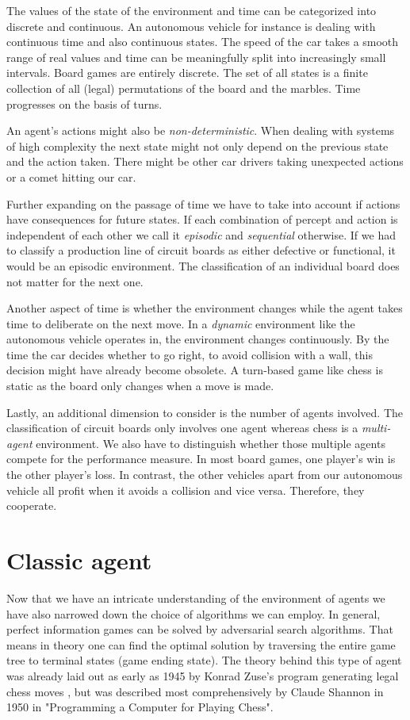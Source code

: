 The values of the state of the environment and time can be categorized into discrete and continuous. An autonomous vehicle for instance is dealing with continuous time and also continuous states. The speed of the car takes a smooth range of real values and time can be meaningfully split into increasingly small intervals. Board games are entirely discrete. The set of all states is a finite collection of all (legal) permutations of the board and the marbles. Time progresses on the basis of turns.

An agent's actions might also be \textit{non-deterministic}. When dealing with systems of high complexity the next state might not only depend on the previous state and the action taken. There might be other car drivers taking unexpected actions or a comet hitting our car.

Further expanding on the passage of time we have to take into account if actions have consequences for future states. If each combination of percept and action is independent of each other we call it \textit{episodic} and \textit{sequential} otherwise. If we had to classify a production line of circuit boards as either defective or functional, it would be an episodic environment. The classification of an individual board does not matter for the next one.

Another aspect of time is whether the environment changes while the agent takes time to deliberate on the next move. In a \textit{dynamic} environment like the autonomous vehicle operates in, the environment changes continuously. By the time the car decides whether to go right, to avoid collision with a wall, this decision might have already become obsolete. A  turn-based game like chess is static as the board only changes when a move is made.

Lastly, an additional dimension to consider is the number of agents involved. The classification of circuit boards only involves one agent whereas chess is a \textit{multi-agent} environment. We also have to distinguish whether those multiple agents compete for the performance measure. In most board games, one player's win is the other player's loss. In contrast, the other vehicles apart from our autonomous vehicle all profit when it avoids a collision and vice versa. Therefore, they cooperate.



\section{Classic agent}
Now that we have an intricate understanding of the environment of agents we have also narrowed down the choice of algorithms we can employ. In general, perfect information games can be solved by adversarial search algorithms. That means in theory one can find the optimal solution by traversing the entire game tree to terminal states (game ending state). The theory behind this type of agent was already laid out as early as 1945 by Konrad Zuse's program generating legal chess moves \cite{knuth_early_1980}, but was described most comprehensively by Claude Shannon in 1950 in "Programming a Computer for Playing Chess". \cite{shannon_xxii_1950}


